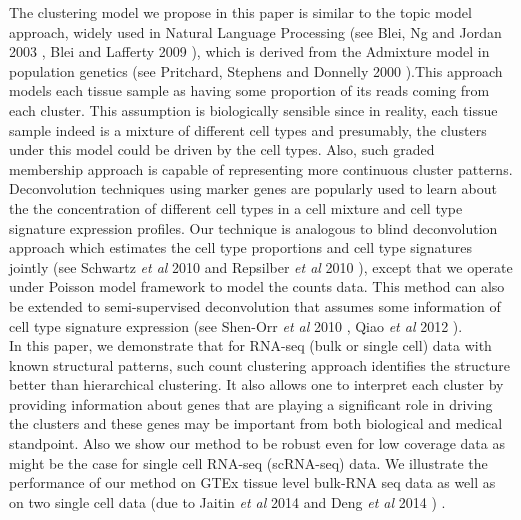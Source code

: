 The clustering model we propose in this paper is similar to the topic model approach, widely used in Natural Language Processing (see Blei, Ng and Jordan 2003 \cite{Blei2003}, Blei and Lafferty 2009 \cite{Blei2009}), which is derived from the Admixture model in population genetics (see Pritchard, Stephens and Donnelly 2000 \cite{Pritchard2000}).This approach models each tissue sample as having some proportion of its reads coming from each cluster. This assumption is biologically sensible since in reality, each tissue sample indeed is a mixture of different cell types and presumably, the clusters under this model could be driven by the cell types. Also, such graded membership approach is capable of representing more continuous cluster patterns. \\[1 pt]

Deconvolution techniques using marker genes are popularly used to learn about the the concentration of different cell types in a cell mixture and cell type signature expression profiles. Our technique is analogous to blind deconvolution approach which estimates the cell type proportions and cell type signatures jointly (see Schwartz \textit{et al} 2010 \cite{Schwartz2010} and Repsilber \textit{et al} 2010 \cite{Repsilber2010}), except that we operate under Poisson model framework to model the counts data. This method can also be extended to semi-supervised deconvolution that assumes some information of cell type signature expression (see Shen-Orr \textit{et al} 2010 \cite{Shen-Orr2010},  Qiao \textit{et al} 2012 \cite{Qiao2012}). \\[1 pt]

In this paper, we demonstrate that for RNA-seq (bulk or single cell) data with known structural patterns, such count clustering approach identifies the structure better than hierarchical clustering. It also allows one to interpret each cluster by providing information about genes that are playing a significant role in driving the clusters and these genes may be important from both biological and medical standpoint. Also we show our method to be robust even for low coverage data as might be the case for single cell RNA-seq (scRNA-seq) data.
We illustrate the performance of our method on GTEx tissue level  bulk-RNA seq data as well as on two single cell data (due to Jaitin \textit{et al} 2014 \cite{Jaitin2014} and Deng \textit{et al} 2014 \cite{Deng2014}) . 


